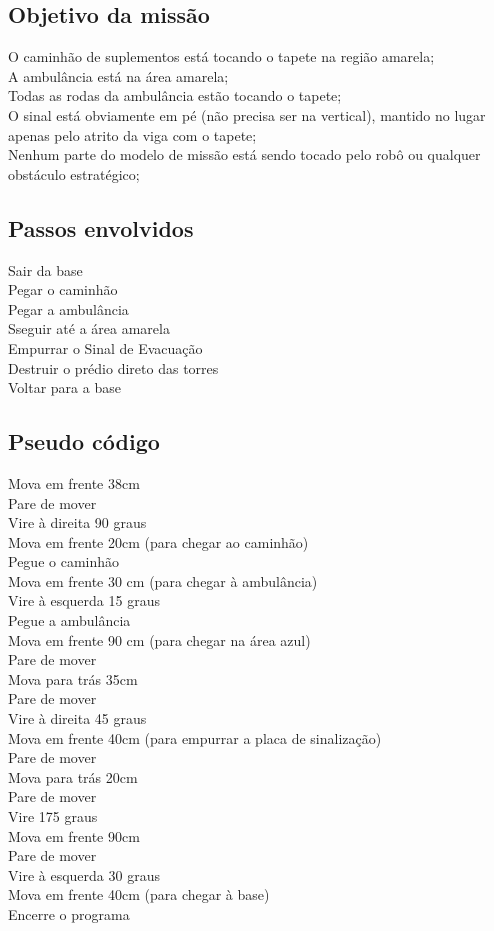 \documentclass{article}
\begin{document}
	\subsection{Objetivo da missão}
		O caminhão de suplementos está tocando o tapete na região amarela;\\
		A ambulância está na área amarela;\\		
		Todas as rodas da ambulância estão tocando o tapete;\\
		O sinal está obviamente em pé (não precisa ser na vertical), mantido no lugar apenas pelo atrito da viga com o tapete;\\
		Nenhum parte do modelo de missão está sendo tocado pelo robô ou qualquer obstáculo estratégico;\\

	\subsection{Passos envolvidos}
		Sair da base\\
		Pegar o caminhão\\
		Pegar a ambulância\\
		Sseguir até a área amarela\\
		Empurrar o Sinal de Evacuação\\
		Destruir o prédio direto das torres\\
		Voltar para a base\\

	\subsection{Pseudo código}
		Mova em frente 38cm\\
		Pare de mover\\
	    Vire à direita 90 graus\\
	    Mova em frente 20cm (para chegar ao caminhão)\\
	    Pegue o caminhão\\
	    Mova em frente 30 cm (para chegar à ambulância)\\
		Vire à esquerda 15 graus\\
		Pegue a ambulância\\
		Mova em frente 90 cm (para chegar na área azul)\\
	    Pare de mover\\
		Mova para trás 35cm\\
	    Pare de mover\\
	    Vire à direita 45 graus\\
	    Mova em frente 40cm (para empurrar a placa de sinalização)\\
	    Pare de mover\\
	    Mova para trás 20cm\\
	    Pare de mover\\
	    Vire 175 graus\\
		Mova em frente 90cm\\
		Pare de mover\\
		Vire à esquerda 30 graus\\
		Mova em frente 40cm (para chegar à base)\\
	    Encerre o programa\\
\end{document}
